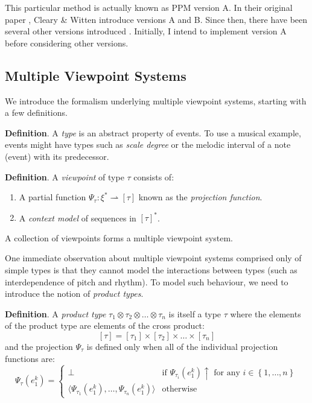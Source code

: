 \documentclass[12pt,a4paper,twoside]{article}
\newcommand{\pair}[1]{\langle #1 \rangle}
\newcommand{\set}[1]{\left\{ #1 \right\}}
\begin{document}
This particular method is actually known as PPM version A. In their original
paper \cite{cleary1984ppm}, Cleary \& Witten introduce versions A and B. Since
then, there have been several other versions introduced \cite{whorley2013phd}.
Initially, I intend to implement version A before considering other versions.

\subsection*{Multiple Viewpoint Systems}

We introduce the formalism underlying multiple viewpoint systems, starting with
a few definitions.

\textbf{Definition}. A \emph{type} is an abstract property of events. To use a
musical example, events might have types such as \emph{scale degree} or the
melodic interval of a note (event) with its predecessor.

\textbf{Definition}. A \emph{viewpoint} of type $\tau$ consists of:
\begin{enumerate}[label=\arabic*., itemsep=0mm]
  \item A partial function $\Psi_\tau : \xi^* \rightharpoonup [\tau]$ known as
    the \emph{projection function}.
  \item A \emph{context model} of sequences in $[\tau]^*$.
\end{enumerate}

A collection of viewpoints forms a multiple viewpoint system.

One immediate observation about multiple viewpoint systems comprised only of
simple types is that they cannot model the interactions between types (such as
interdependence of pitch and rhythm). To model such behaviour, we need to
introduce the notion of \emph{product types}.

\textbf{Definition}. A \emph{product type} $\tau_1 \otimes \tau_2 \otimes
\ldots \otimes \tau_n$ is itself a type $\tau$ where the elements of the
product type are elements of the cross product:
$$ [\tau] = [\tau_1] \times [\tau_2] \times \ldots \times [\tau_n] $$
and the projection $\Psi_\tau$ is defined only when all of the individual
projection functions are:
$$ \Psi_\tau(e_1^k) = \begin{cases} 
  \bot & \text{if } \Psi_{\tau_i}(e_1^k)\uparrow \text{ for any } i \in \set{1,
  \ldots, n} \\
  \pair{ \Psi_{\tau_1}(e_1^k), \ldots, \Psi_{\tau_n}(e_1^k) } & \text{otherwise}
\end{cases} $$
\end{document}
